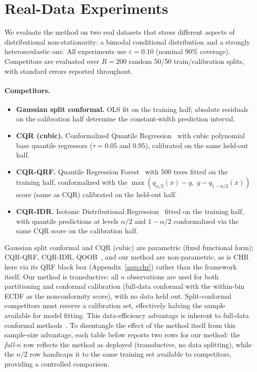 \documentclass[11pt]{article}
\begin{document}
\section{Real-Data Experiments}
\label{sec:realdata}

We evaluate the method on two real datasets that stress different aspects of
distributional non-stationarity: a bimodal conditional distribution and a
strongly heteroscedastic one.
All experiments use $\varepsilon = 0.10$ (nominal 90\% coverage).
Competitors are evaluated over $R=200$ random 50/50 train/calibration splits,
with standard errors reported throughout.

\paragraph{Competitors.}
\begin{itemize}
  \item \textbf{Gaussian split conformal.} OLS fit on the training half;
        absolute residuals on the calibration half determine the
        constant-width prediction interval.
  \item \textbf{CQR (cubic).} Conformalized Quantile Regression~\citep{RomanoEtAl2019}
        with cubic polynomial base quantile regressors ($\tau = 0.05$ and $0.95$),
        calibrated on the same held-out half.
  \item \textbf{CQR-QRF.} Quantile Regression Forest~\citep{Meinshausen2006} with 500
        trees fitted on the training half, conformalized with the
        $\max(q_{\alpha/2}(x)-y,\; y-q_{1-\alpha/2}(x))$ score (same as CQR)
        calibrated on the held-out half.
  \item \textbf{CQR-IDR.} Isotonic Distributional Regression~\citep{HenziEtAl2021}
        fitted on the training half, with quantile predictions at levels
        $\alpha/2$ and $1-\alpha/2$ conformalized via the same CQR score
        on the calibration half.
\end{itemize}
Gaussian split conformal and CQR (cubic) are parametric (fixed functional
form); CQR-QRF, CQR-IDR, QOOB~\citep{GuptaEtAl2022}, and our method are
non-parametric, as is CHR here via its QRF black box (Appendix~\ref{app:chr})
rather than the framework itself.
Our method is transductive: all $n$ observations are used for both partitioning
and conformal calibration (full-data conformal with the within-bin ECDF as
the nonconformity score), with no data held out.
Split-conformal competitors must reserve a calibration set, effectively halving
the sample available for model fitting.
This data-efficiency advantage is inherent to full-data conformal
methods~\citep{Barber2021}.
To disentangle the effect of the method itself from this sample-size advantage,
each table below reports two rows for our method: the \emph{full-$n$} row
reflects the method as deployed (transductive, no data splitting), while the
\emph{$n/2$} row handicaps it to the same training set available to competitors,
providing a controlled comparison.
\end{document}
